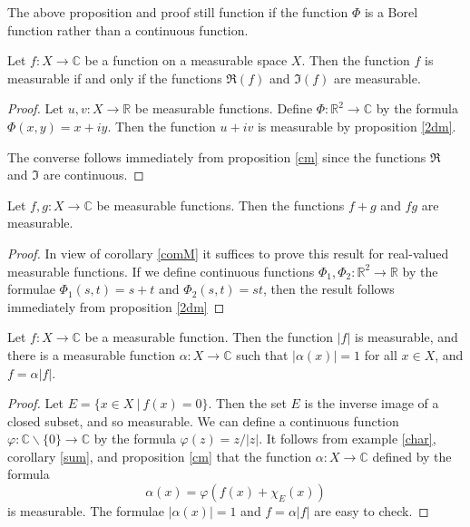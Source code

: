 The above proposition and proof still function if the function $\Phi$ is a Borel function rather than a continuous function.

\begin{corollary} \label{comM}
Let $f\colon X\rightarrow {\mathbb C}$ be a function on a measurable space $X$.  Then the function $f$ is measurable if and only if the functions $\Re (f)$ and $\Im (f)$ are measurable.
\end{corollary}

\begin{proof}
Let $u,v\colon X\rightarrow {\mathbb R}$ be measurable functions.  Define $\Phi \colon {\mathbb R}^2\rightarrow {\mathbb C}$ by the formula $\Phi (x,y) = x+iy$.  Then the function $u+iv$ is measurable by proposition \ref{2dm}.

The converse follows immediately from proposition \ref{cm} since the functions $\Re$ and $\Im$ are continuous.
\end{proof}

\begin{corollary} \label{sum}
Let $f,g\colon X\rightarrow {\mathbb C}$ be measurable functions.  Then the functions $f+g$ and $fg$ are measurable.
\end{corollary}

\begin{proof}
In view of corollary \ref{comM} it suffices to prove this result for real-valued measurable functions.  If we define continuous functions $\Phi_1,\Phi_2 \colon {\mathbb R}^2\rightarrow {\mathbb R}$ by the formulae $\Phi_1 (s,t)=s+t$ and $\Phi_2 (s,t)=st$, then the result follows immediately from proposition \ref{2dm}
\end{proof}



\begin{proposition}
Let $f\colon X\rightarrow {\mathbb C}$ be a measurable function.  Then the function $|f|$ is measurable, and there is a measurable function $\alpha \colon X\rightarrow {\mathbb C}$ such that $|\alpha (x)| =1$ for all $x\in X$, and $f=\alpha |f|$.
\end{proposition}

\begin{proof}
Let $E = \{ x\in X \ |\ f(x)=0 \}$.  Then the set $E$ is the inverse image of a closed subset, and so measurable.  We can define a continuous function $\varphi \colon {\mathbb C}\backslash \{ 0\} \rightarrow {\mathbb C}$ by the formula $\varphi (z) = z/|z|$.  It follows from example \ref{char}, corollary \ref{sum}, and proposition \ref{cm} that the function $\alpha \colon X\rightarrow {\mathbb C}$ defined by the formula
$$\alpha (x) = \varphi (f(x) + \chi_E (x))$$
is measurable.  The formulae $|\alpha (x)| =1$ and $f=\alpha |f|$ are easy to check.
\end{proof}

